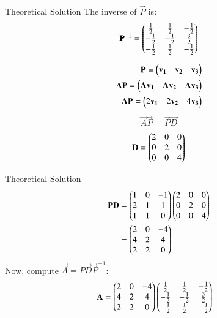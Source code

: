 \documentclass{beamer}
\begin{document}
\begin{frame}{Theoretical Solution}
The inverse of $\vec{P}$ is:
\begin{align}
\mathbf{P}^{-1} =
\begin{pmatrix}
\frac{1}{2} & \frac{1}{2} & -\frac{1}{2} \\
-\frac{1}{2} & -\frac{1}{2} & \frac{3}{2} \\
-\frac{1}{2} & \frac{1}{2} & -\frac{1}{2}
\end{pmatrix}
\end{align}

\begin{align}
\mathbf{P}=\begin{pmatrix}\mathbf{v_1}&\mathbf{v_2}&\mathbf{v_3}\end{pmatrix}\\
\mathbf{A}\mathbf{P}=\begin{pmatrix}\mathbf{A}\mathbf{v_1}&\mathbf{A}\mathbf{v_2}&\mathbf{A}\mathbf{v_3}\end{pmatrix}\\
\mathbf{A}\mathbf{P}=\begin{pmatrix}2\mathbf{v_1}&2\mathbf{v_2}&4\mathbf{v_3}\end{pmatrix}
\end{align}
\begin{align}
\vec{A}\vec{P}=\vec{P}\vec{D}
\end{align}
\begin{align}
\mathbf{D}=
\begin{pmatrix}
2 & 0 & 0 \\
0 & 2 & 0 \\
0 & 0 & 4
\end{pmatrix}
\end{align}
\end{frame}

\begin{frame}{Theoretical Solution}
\begin{align}
\mathbf{PD} &= \begin{pmatrix}
1 & 0 & -1 \\
2 & 1 & 1 \\
1 & 1 & 0
\end{pmatrix}
\begin{pmatrix}
2 & 0 & 0 \\
0 & 2 & 0 \\
0 & 0 & 4
\end{pmatrix} \\
&= \begin{pmatrix}
2 & 0 & -4 \\
4 & 2 & 4 \\
2 & 2 & 0
\end{pmatrix}
\end{align}
Now, compute $\vec{A} = \vec{PD}\vec{P}^{-1}$:
\begin{align}
\mathbf{A} &= \begin{pmatrix}
2 & 0 & -4 \\
4 & 2 & 4 \\
2 & 2 & 0
\end{pmatrix}
\begin{pmatrix}
\frac{1}{2} & \frac{1}{2} & -\frac{1}{2} \\
-\frac{1}{2} & -\frac{1}{2} & \frac{3}{2} \\
-\frac{1}{2} & \frac{1}{2} & -\frac{1}{2}
\end{pmatrix}
\end{align}
\end{frame}
\end{document}
